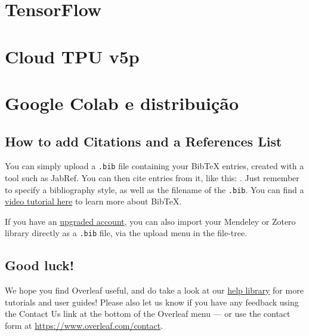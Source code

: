 \documentclass{article}
\begin{document}
\section{TensorFlow}

\section{Cloud TPU v5p}

\section{Google Colab e distribuição}

\subsection{How to add Citations and a References List}

You can simply upload a \verb|.bib| file containing your BibTeX entries, created with a tool such as JabRef. You can then cite entries from it, like this: \cite{greenwade93}. Just remember to specify a bibliography style, as well as the filename of the \verb|.bib|. You can find a \href{https://www.overleaf.com/help/97-how-to-include-a-bibliography-using-bibtex}{video tutorial here} to learn more about BibTeX.

If you have an \href{https://www.overleaf.com/user/subscription/plans}{upgraded account}, you can also import your Mendeley or Zotero library directly as a \verb|.bib| file, via the upload menu in the file-tree.

\subsection{Good luck!}

We hope you find Overleaf useful, and do take a look at our \href{https://www.overleaf.com/learn}{help library} for more tutorials and user guides! Please also let us know if you have any feedback using the Contact Us link at the bottom of the Overleaf menu --- or use the contact form at \url{https://www.overleaf.com/contact}.



\end{document}
